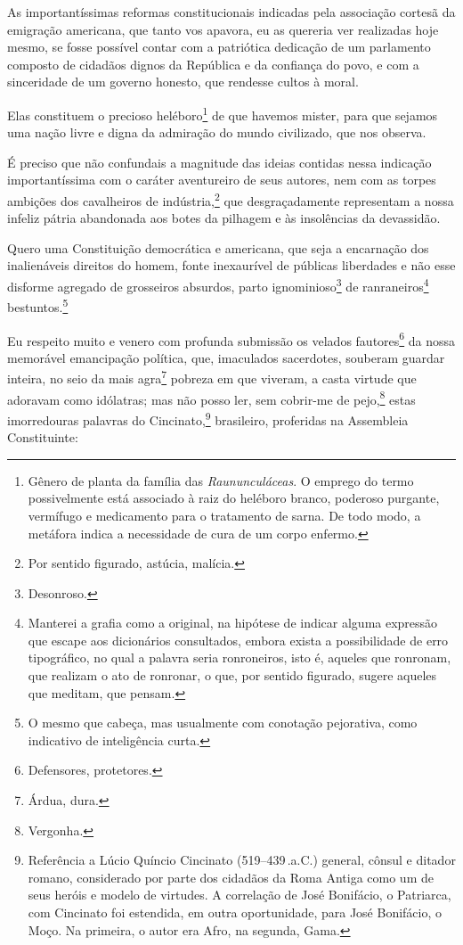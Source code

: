 As importantíssimas reformas constitucionais indicadas pela associação
cortesã da emigração americana, que tanto vos apavora, eu as quereria
ver realizadas hoje mesmo, se fosse possível contar com a patriótica
dedicação de um parlamento composto de cidadãos dignos da República e da
confiança do povo, e com a sinceridade de um governo honesto, que
rendesse cultos à moral.

Elas constituem o precioso heléboro\footnote{Gênero de planta da \label{heleboro}
  família das \emph{Raununculáceas}. O emprego do termo possivelmente
  está associado à raiz do heléboro branco, poderoso purgante, vermífugo
  e medicamento para o tratamento de sarna. De todo modo, a metáfora
  indica a necessidade de cura de um corpo enfermo.} de que havemos
mister, para que sejamos uma nação livre e digna da admiração do mundo
civilizado, que nos observa.

É preciso que não confundais a magnitude das ideias contidas nessa
indicação importantíssima com o caráter aventureiro de seus autores, nem
com as torpes ambições dos cavalheiros de indústria,\footnote{Por
  sentido figurado, astúcia, malícia.} que desgraçadamente representam
a nossa infeliz pátria abandonada aos botes da pilhagem e às insolências
da devassidão.

Quero uma Constituição democrática e americana, que seja a encarnação
dos inalienáveis direitos do homem, fonte inexaurível de públicas
liberdades e não esse disforme agregado de grosseiros absurdos, parto
ignominioso\footnote{Desonroso.} de ranraneiros\footnote{Manterei a
  grafia como a original, na hipótese de indicar alguma expressão que
  escape aos dicionários consultados, embora exista a possibilidade de
  erro tipográfico, no qual a palavra seria ronroneiros, isto é, aqueles
  que ronronam, que realizam o ato de ronronar, o que, por sentido
  figurado, sugere aqueles que meditam, que pensam.}
bestuntos.\footnote{O mesmo que cabeça, mas usualmente com conotação
  pejorativa, como indicativo de inteligência curta.}

Eu respeito muito e venero com profunda submissão os velados
fautores\footnote{Defensores, protetores.} da nossa memorável
emancipação política, que, imaculados sacerdotes, souberam guardar
inteira, no seio da mais agra\footnote{Árdua, dura.} pobreza em que
viveram, a casta virtude que adoravam como idólatras; mas não posso ler,
sem cobrir-me de pejo,\footnote{Vergonha.} estas imorredouras palavras
do Cincinato,\footnote{Referência a Lúcio Quíncio Cincinato (519--439\,.a.C.) general, cônsul e ditador romano, considerado por parte
  dos cidadãos da Roma Antiga como um de seus heróis e modelo de
  virtudes. A correlação de José Bonifácio, o Patriarca, com Cincinato
  foi estendida, em outra oportunidade, para José Bonifácio, o Moço. Na
  primeira, o autor era Afro, na segunda, Gama.}
brasileiro, proferidas na Assembleia Constituinte:


